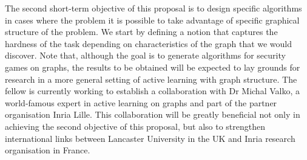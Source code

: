 The second short-term objective of this proposal is to design specific algorithms in cases where the problem it is possible to take advantage of specific graphical structure of the problem. We start by defining a notion that captures the hardness of the task depending on characteristics of the graph that we would discover. Note that, although the goal is to generate algorithms for security games on graphs, the results to be obtained will be expected to lay grounds for research in a more general setting of active learning with graph structure. The fellow is currently working to establish a collaboration with Dr Michal Valko, a world-famous expert in active learning on graphs and part of the partner organisation Inria Lille. This collaboration will be greatly beneficial not only in achieving the second objective of this proposal, but also to strengthen international links between Lancaster University in the UK and Inria research organisation in France.  
 



